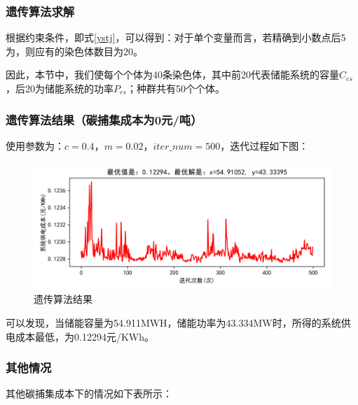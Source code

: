 \documentclass{cumcmthesis}
\begin{document}
	\subsubsection{遗传算法求解}\label{yc}
	根据约束条件，即式\ref{ystj}，可以得到：对于单个变量而言，若精确到小数点后5为，则应有的染色体数目为20。
	
	因此，本节中，我们使每个个体为40条染色体，其中前20代表储能系统的容量$ C_{es} $，后20为储能系统的功率$ P_{es} $；种群共有50个个体。
	
	
	\subsubsection{遗传算法结果（碳捕集成本为0元/吨）}
	使用参数为：$ c=0.4\texttt{，}m=0.02\texttt{，}iter\_num=500 $，迭代过程如下图：
	\begin{figure}[H]
		\centering
		\includegraphics[width=1\linewidth]{figures/交叉：0.4，变异：0.02，迭代次数：500，成本：0}
		\caption{遗传算法结果}
		\label{fig:0}
	\end{figure}
	
	可以发现，当储能容量为54.911MWH，储能功率为43.334MW时，所得的系统供电成本最低，为0.12294元/KWh。
	
	\subsubsection{其他情况}
	其他碳捕集成本下的情况如下表所示：
	
\end{document}

